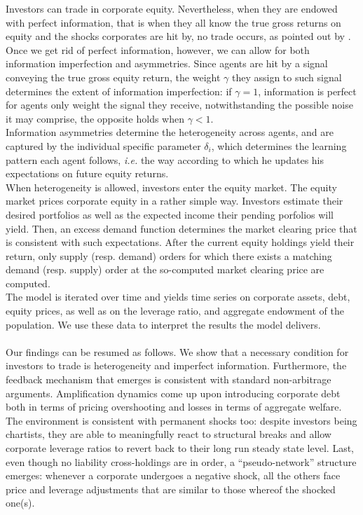 \documentclass[11pt]{article}
\begin{document}
Investors can trade in corporate equity. Nevertheless, when they are endowed with perfect information, that is when they all know the true gross returns on equity and the shocks corporates are hit by, no trade occurs, as pointed out by \citet{6}. Once we get rid of perfect information, however, we can allow for both information imperfection and asymmetries. Since agents are hit by a signal conveying the true gross equity return, the weight $\gamma$ they assign to such signal determines the extent of information imperfection: if $\gamma=1$, information is perfect for agents only weight the signal they receive, notwithstanding the possible noise it may comprise, the opposite holds when $\gamma<1$.\\ Information asymmetries determine the heterogeneity across agents, and are captured by the individual specific parameter $\delta_i$, which determines the learning pattern each agent follows, \emph{i.e.} the way according to which he updates his expectations on future equity returns.\\
When heterogeneity is allowed, investors enter the equity market. The equity market prices corporate equity in a rather simple way. Investors estimate their desired portfolios as well as the expected income their pending porfolios will yield. Then, an excess demand function determines the market clearing price that is consistent with such expectations. After the current equity holdings yield their return, only supply (resp. demand) orders for which there exists a matching demand (resp. supply) order at the so-computed market clearing price are computed.\\
The model is iterated over time and yields time series on corporate assets, debt, equity prices, as well as on the leverage ratio, and aggregate endowment of the population. We use these data to interpret the results the model delivers.\\\\
Our findings can be resumed as follows. We show that a necessary condition for investors to trade is heterogeneity and imperfect information. Furthermore, the feedback mechanism that emerges is consistent with standard non-arbitrage arguments. Amplification dynamics come up upon introducing corporate debt both in terms of pricing overshooting and losses in terms of aggregate welfare. The environment is consistent with permanent shocks too: despite investors being chartists, they are able to meaningfully react to structural breaks and allow corporate leverage ratios to revert back to their long run steady state level. Last, even though no liability cross-holdings are in order, a ``pseudo-network'' structure emerges: whenever a corporate undergoes a negative shock, all the others face price and leverage adjustments that are similar to those whereof the shocked one(s).
\end{document}
